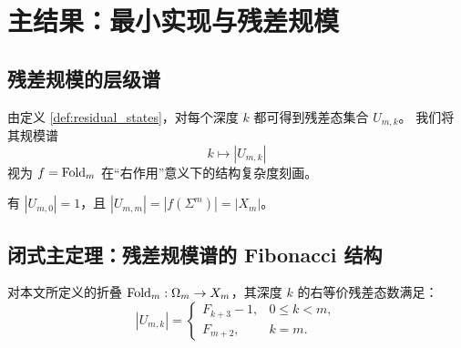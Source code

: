 \section{主结果：最小实现与残差规模}\label{sec:theorems}

\subsection{残差规模的层级谱}
由定义 \ref{def:residual_states}，对每个深度 $k$ 都可得到残差态集合 $U_{m,k}$。
我们将其规模谱
\[
k\mapsto |U_{m,k}|
\]
视为 $f=\mathrm{Fold}_m$ 在“右作用”意义下的结构复杂度刻画。

\begin{proposition}[边界值（占位）]\label{prop:boundary_values}
有 $|U_{m,0}|=1$，且 $|U_{m,m}|=|f(\Sigma^m)|=|X_m|$。
\end{proposition}

\subsection{闭式主定理：残差规模谱的 Fibonacci 结构}
\begin{theorem}[残差规模谱的闭式]\label{thm:residual_closed_form}
对本文所定义的折叠 $\mathrm{Fold}_m:\Omega_m\to X_m$，其深度 $k$ 的右等价残差态数满足：
\[
|U_{m,k}|=
\begin{cases}
F_{k+3}-1, & 0\le k<m,\\
F_{m+2}, & k=m.
\end{cases}
\]
\end{theorem}

